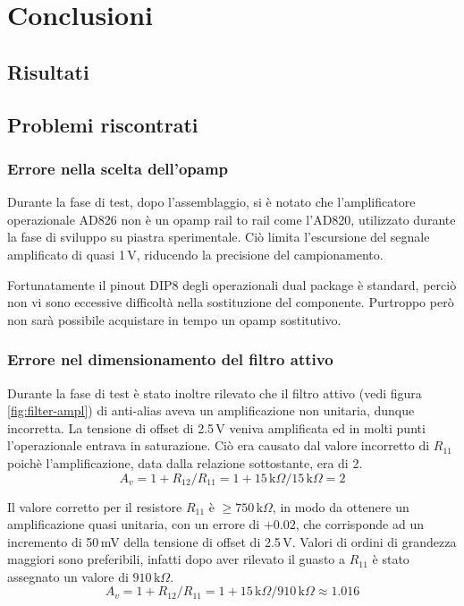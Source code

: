\chapter{Conclusioni}
\section{Risultati}

\section{Problemi riscontrati}
\subsection{Errore nella scelta dell'opamp}
\label{sec:err-opamp}

Durante la fase di test, dopo l'assemblaggio, si \`e notato che
l'amplificatore operazionale AD826 non \`e un opamp rail to rail come l'AD820,
utilizzato durante la fase di sviluppo su piastra sperimentale.  Ci\`o limita
l'escursione del segnale amplificato di quasi 1\,V, riducendo la precisione
del campionamento.

Fortunatamente il pinout DIP8 degli operazionali dual package \`e standard,
perci\`o non vi sono eccessive difficolt\`a nella sostituzione del componente.
Purtroppo per\`o non sar\`a possibile acquistare in tempo un opamp
sostitutivo.

\subsection{Errore nel dimensionamento del filtro attivo}
\label{sec:err-filter}

Durante la fase di test \`e stato inoltre rilevato che il filtro attivo (vedi
figura \ref{fig:filter-ampl}) di anti-alias aveva un amplificazione non
unitaria, dunque incorretta.  La tensione di offset di 2.5\,V veniva
amplificata ed in molti punti l'operazionale entrava in saturazione.  Ci\`o
era causato dal valore incorretto di \(R_{11}\) poich\`e l'amplificazione,
data dalla relazione sottostante, era  di 2.
\[
    A_v = 1+R_{12}/R_{11} = 1+15\,\text{k}\Omega/15\,\text{k}\Omega = 2
\]

Il valore corretto per il resistore \(R_{11}\) \`e
\(\geq 750\,\text{k}\Omega\), in modo da ottenere un amplificazione quasi
unitaria, con un errore di \(+0.02\), che corrisponde ad un incremento di
50\,mV della tensione di offset di 2.5\,V. Valori di ordini di grandezza
maggiori sono preferibili, infatti dopo aver rilevato il guasto a \(R_{11}\)
\`e stato assegnato un valore di \(910\,\text{k}\Omega\).
\[
    A_v = 1+R_{12}/R_{11} = 1+15\,\text{k}\Omega/910\,\text{k}\Omega \approx 1.016
\]

